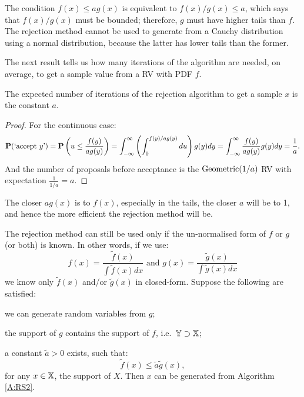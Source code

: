 \begin{classwork}
The condition $f(x)\leq ag(x)$ is equivalent to $f(x)/g(x)\leq a$, which says that $f(x)/g(x)$ must be bounded; therefore, $g$ must have higher tails than $f$.
The rejection method cannot be used to generate from a Cauchy distribution using a normal distribution, because the latter has lower tails than the former.
\end{classwork}


The next result tells us how many iterations of the algorithm are needed, on average, to get a sample value from a RV with PDF $f$.

\begin{prop} The expected number of iterations of the rejection algorithm to get a sample $x$ is the constant $a$.

\begin{proof}
For the continuous case:
\begin{displaymath}
\mathbf{P}(\textrm{`accept }y\textrm{'})=\mathbf{P}\left( u\leq \frac{f(y)}{ag(y)}\right)=\int^{\infty}_{-\infty}\left(\int^{f(y)/ag(y)}_0du\right)g(y)dy=\int^{\infty}_{-\infty}\frac{f(y)}{ag(y)}g(y)dy=\frac{1}{a}.
\end{displaymath}
And the number of proposals before acceptance is the $\mbox{{\rm Geometric}}(1/a)$ RV with expectation $\frac{1}{1/a}=a$.
\end{proof}
\end{prop}

The closer $ag(x)$ is to $f(x)$, especially in the tails, the closer $a$ will be to 1, and hence the more efficient the rejection method will be.

The rejection method can still be used only if the un-normalised form of $f$ or $g$ (or both) is known. In other words, if we use:
$$f(x)=\frac{\tilde{f}(x)}{\int \tilde{f}(x)dx} \textrm{ and } g(x)=\frac{\tilde{g}(x)}{\int \tilde{g}(x)dx} $$
we know only $\tilde{f} (x)$ and/or $\tilde{g}(x)$ in closed-form.  Suppose the following are satisfied:
\begin{asparaenum}[(a)]
\item	we can generate random variables from $g$;
\item	the support of $g$ contains the support of $f$, i.e.~$\mathbb{Y} \supset \mathbb{X}$;
\item	a constant $\tilde{a} > 0$ exists, such that:
\begin{equation}
\tilde{f}(x)\leq\tilde{a}\tilde{g}(x),
\end{equation}
for any $x\in \mathbb{X}$, the support of $X$.  Then $x$ can be generated from Algorithm \ref*{A:RS2}.
\end{asparaenum}

